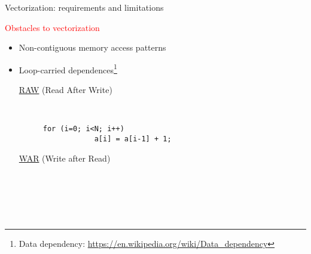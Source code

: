 \documentclass[10pt,xcolor=table]{beamer}
\begin{document}
\begin{frame}[fragile]{Vectorization: requirements and limitations}

  \textcolor{red}{Obstacles to vectorization}
  \begin{itemize}
  \item Non-contiguous memory access patterns
  \item Loop-carried dependences\footnote{Data dependency: \url{https://en.wikipedia.org/wiki/Data_dependency}}
    \begin{description}
    \item[\underline{RAW} (Read After Write)] ~\\
      \begin{minipage}{5cm}
        \begin{lstlisting}[style=c,gobble=4,caption={\bf \textcolor{red}{The loop cannot be vectorized}}]
          for (i=0; i<N; i++)
            a[i] = a[i-1] + 1;
        \end{lstlisting}
      \end{minipage}

      \vspace*{0.5cm}

    \item[\underline{WAR} (Write after Read)] ~\\
      \begin{columns}
         \
      \end{columns}
    \end{description}
  \end{itemize}

\end{frame}
\end{document}
